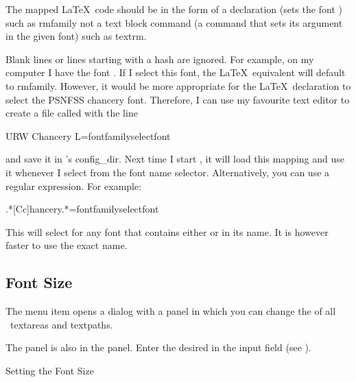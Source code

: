 \begin{information}
The mapped \LaTeX\ code should be in the form of a declaration (sets
the font ) such as \gls{rmfamily} not a 
text block command (a command that sets its argument in the given font)
such as \gls{textrm}.
\end{information}

Blank lines or lines starting with a \gls{hash} are ignored. For
example, on my computer I have the font . If I
select this font, the \LaTeX\ equivalent will default to
\gls{rmfamily}. However, it would be more appropriate for the
\LaTeX\ declaration to select the PSNFSS chancery font. Therefore, I
can use my favourite text editor to create a file called
 with the line
\begin{compactcodebox*}
URW Chancery L=\gls{fontfamily}\gls{selectfont}
\end{compactcodebox*}%
and save it in \FlowframTk's \gls{config_dir}. Next time I
start \FlowframTk, it will load this mapping and use it whenever
I select  from the font name selector.
Alternatively, you can use a regular expression. For example:
\begin{compactcodebox*}
.*[Cc]hancery.*=\gls{fontfamily}\gls{selectfont}
\end{compactcodebox*}%
This will select  for any font
that contains either  or  in its name.
It is however faster to use the exact name.


\subsection{Font Size}\label{sec:fontsize}


The  menu item opens a dialog with a 
 panel in which you can change the
of all \selected\ \glspl{textarea} and \glspl{textpath}.


The  panel is also in the 
panel. Enter the desired  in the input field
(see ).

{}
{Setting the Font Size}

